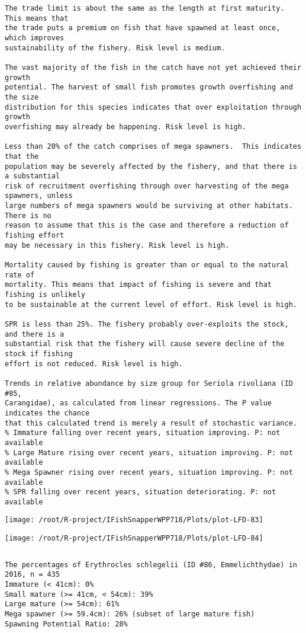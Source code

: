 \documentclass{report}\usepackage[]{graphicx}\usepackage[]{color}
\makeatletter
\def\maxwidth{ %
  \ifdim\Gin@nat@width>\linewidth
    \linewidth
  \else
    \Gin@nat@width
  \fi
}
\newenvironment{kframe}{%
 \def\at@end@of@kframe{}%
 \ifinner\ifhmode%
  \def\at@end@of@kframe{\end{minipage}}%
  \begin{minipage}{\columnwidth}%
 \fi\fi%
 \def\FrameCommand##1{\hskip\@totalleftmargin \hskip-\fboxsep
 \colorbox{shadecolor}{##1}\hskip-\fboxsep
     \hskip-\linewidth \hskip-\@totalleftmargin \hskip\columnwidth}%
 \MakeFramed {\advance\hsize-\width
   \@totalleftmargin\z@ \linewidth\hsize
   \@setminipage}}%
 {\par\unskip\endMakeFramed%
 \at@end@of@kframe}
\newenvironment{knitrout}{}{} %
\makeatother
\begin{document}
\begin{knitrout}
\begin{kframe}
\begin{verbatim}
The trade limit is about the same as the length at first maturity.  This means that
the trade puts a premium on fish that have spawned at least once, which improves
sustainability of the fishery. Risk level is medium.

The vast majority of the fish in the catch have not yet achieved their growth
potential. The harvest of small fish promotes growth overfishing and the size
distribution for this species indicates that over exploitation through growth
overfishing may already be happening. Risk level is high.

Less than 20% of the catch comprises of mega spawners.  This indicates that the
population may be severely affected by the fishery, and that there is a substantial
risk of recruitment overfishing through over harvesting of the mega spawners, unless
large numbers of mega spawners would be surviving at other habitats. There is no
reason to assume that this is the case and therefore a reduction of fishing effort
may be necessary in this fishery. Risk level is high.
 
Mortality caused by fishing is greater than or equal to the natural rate of
mortality. This means that impact of fishing is severe and that fishing is unlikely
to be sustainable at the current level of effort. Risk level is high.
 
SPR is less than 25%. The fishery probably over-exploits the stock, and there is a
substantial risk that the fishery will cause severe decline of the stock if fishing
effort is not reduced. Risk level is high.
 
Trends in relative abundance by size group for Seriola rivoliana (ID #85,
Carangidae), as calculated from linear regressions. The P value indicates the chance
that this calculated trend is merely a result of stochastic variance.
% Immature falling over recent years, situation improving. P: not available
% Large Mature rising over recent years, situation improving. P: not available
% Mega Spawner rising over recent years, situation improving. P: not available
% SPR falling over recent years, situation deteriorating. P: not available
\end{verbatim}
\end{kframe}
\texttt{[image: /root/R-project/IFishSnapperWPP718/Plots/plot-LFD-83]} 

\texttt{[image: /root/R-project/IFishSnapperWPP718/Plots/plot-LFD-84]} 
\begin{kframe}\begin{verbatim}
\end{verbatim}
\end{kframe}
\clearpage
\newpage
\begin{kframe}\begin{verbatim}The percentages of Erythrocles schlegelii (ID #86, Emmelichthydae) in 2016, n = 435
Immature (< 41cm): 0%
Small mature (>= 41cm, < 54cm): 39%
Large mature (>= 54cm): 61%
Mega spawner (>= 59.4cm): 26% (subset of large mature fish)
Spawning Potential Ratio: 28%
 

\end{verbatim}
\end{kframe}
\end{knitrout}
\end{document}
